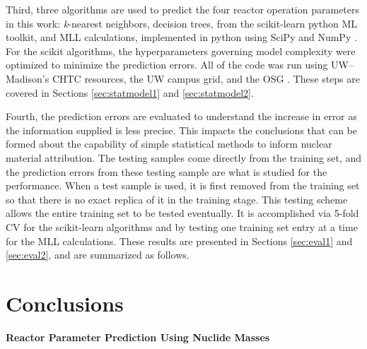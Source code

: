 Third, three algorithms are used to predict the four reactor operation
parameters in this work: \textit{k}-nearest neighbors, decision trees, from the
scikit-learn python \gls{ML} toolkit, and \gls{MLL} calculations, implemented
in python using SciPy and NumPy \cite{scikit, scipy, numpy}.  For the scikit
algorithms, the hyperparameters governing model complexity were optimized to
minimize the prediction errors.  All of the code was run using
\gls{UW}--Madison's \gls{CHTC} resources, the \gls{UW} campus grid, and the
\gls{OSG} \cite{osg07, osg09}.  These steps are covered in Sections
\ref{sec:statmodel1} and \ref{sec:statmodel2}.

Fourth, the prediction errors are evaluated to understand the increase in error
as the information supplied is less precise. This impacts the conclusions that
can be formed about the capability of simple statistical methods to inform
nuclear material attribution.  The testing samples come directly from the
training set, and the prediction errors from  these testing sample are what is
studied for the performance.  When a test sample is used, it is first removed
from the training set so that there is no exact replica of it in the training
stage.  This testing scheme allows the entire training set to be tested
eventually.  It is accomplished via 5-fold \gls{CV} for the scikit-learn
algorithms and by testing one training set entry at a time for the \gls{MLL}
calculations.  These results are presented in Sections \ref{sec:eval1} and
\ref{sec:eval2}, and are summarized as follows.

\section{Conclusions}
\label{sec:concl}

\noindent \textbf{Reactor Parameter Prediction Using Nuclide Masses}



